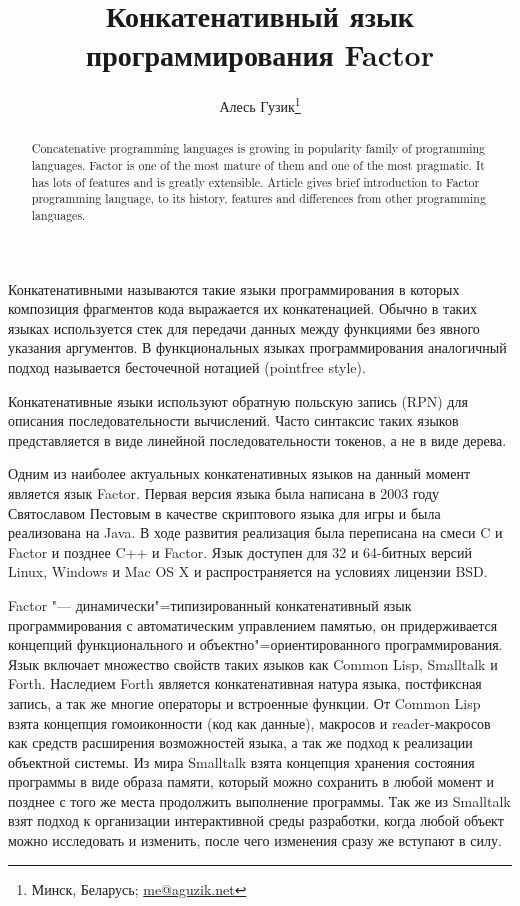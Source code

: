 \documentclass[a5paper,10pt]{article}
\begin{document}
\title{Конкатенативный язык программирования Factor}

\author{Алесь Гузик\footnote{Минск, Беларусь; \url{me@aguzik.net}}}
\date{}
\maketitle


\begin{abstract}
  Concatenative programming languages is growing in popularity family
  of programming languages. Factor is one of the most mature of them
  and one of the most pragmatic. It has lots of features and is
  greatly extensible. Article gives brief introduction to Factor
  programming language, to its history, features and differences from
  other programming languages.
\end{abstract}

Конкатенативными называются такие языки программирования в которых
композиция фрагментов кода выражается их конкатенацией. Обычно в
таких языках используется стек для передачи данных между функциями без
явного указания аргументов. В функциональных языках программирования
аналогичный подход называется бесточечной нотацией (pointfree style).

Конкатенативные языки используют обратную польскую запись (RPN) для
описания последовательности вычислений. Часто синтаксис таких языков
представляется в виде линейной последовательности токенов, а не в виде
дерева.

Одним из наиболее актуальных конкатенативных языков на данный момент
является язык Factor. Первая версия языка была написана в 2003 году
Святославом Пестовым в качестве скриптового языка для игры и была
реализована на Java. В ходе развития реализация была переписана на
смеси C и Factor и позднее C++ и Factor. Язык доступен для 32 и
64-битных версий Linux, Windows и Mac OS X и распространяется на
условиях лицензии BSD.

Factor "--- динамически"=типизированный конкатенативный язык
программирования с автоматическим управлением памятью, он придерживается
концепций функционального и объектно"=ориентированного
программирования. Язык включает  множество свойств таких языков
как Common Lisp, Smalltalk и Forth. Наследием Forth является
конкатенативная натура языка, постфиксная запись, а так же многие
операторы и встроенные функции. От Common Lisp взята концепция
гомоиконности (код как данные), макросов и reader-макросов как средств
расширения возможностей языка, а так же подход к реализации объектной
системы. Из мира Smalltalk взята концепция хранения состояния
программы в виде образа памяти, который можно сохранить в любой момент
и позднее с того же места продолжить выполнение программы. Так же из
Smalltalk взят подход к организации интерактивной среды разработки,
когда любой объект можно исследовать и изменить, после чего изменения
сразу же вступают в силу.
\end{document}
